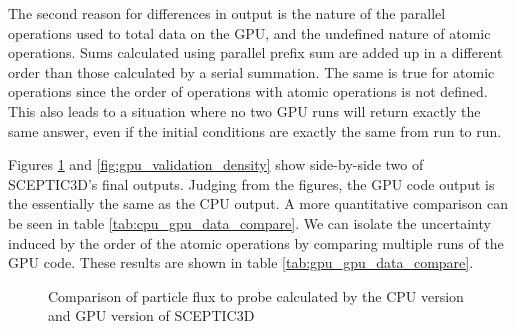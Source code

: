 The second reason for differences in output is the nature of the parallel operations used to total data on the GPU, and the undefined nature of atomic operations. Sums calculated using parallel prefix sum are added up in a different order than those calculated by a serial summation.\cite{Whitehead2011} The same is true for atomic operations since the order of operations with atomic operations is not defined. This also leads to a situation where no two GPU runs will return exactly the same answer, even if the initial conditions are exactly the same from run to run.\cite{NVIDIACorporation2011}

Figures \ref{fig:gpu_validation_pflux} and \ref{fig:gpu_validation_density} show side-by-side two of SCEPTIC3D's final outputs. Judging from the figures, the GPU code output is the essentially the same as the CPU output. A more quantitative comparison can be seen in table \ref{tab:cpu_gpu_data_compare}. We can isolate the uncertainty induced by the order of the atomic operations by comparing multiple runs of the GPU code. These results are shown in table \ref{tab:gpu_gpu_data_compare}. 


\begin{figure}
\centering
\noindent
	\caption[GPU Validation: Particle Flux Comparison]{Comparison of particle flux to probe calculated by the CPU version and GPU version of SCEPTIC3D}	
	\label{fig:gpu_validation_pflux}
\end{figure}

